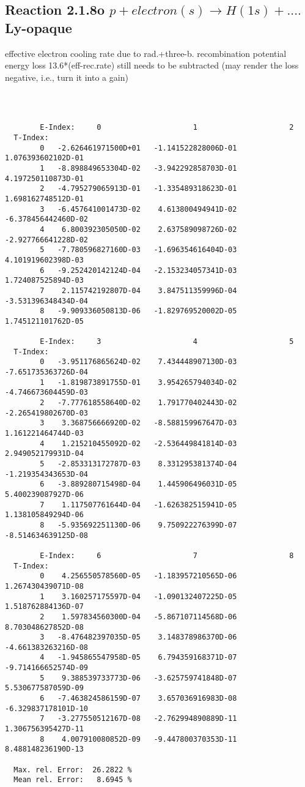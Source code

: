 \subsection{
  Reaction 2.1.8o $p + electron(s) \rightarrow H(1s) + ....$ Ly-opaque
}

   effective electron cooling rate due to rad.+three-b. recombination
   potential energy loss 13.6*(eff-rec.rate) still needs to be
   subtracted (may render the loss negative, i.e., turn it into a gain)

\begin{verbatim}



        E-Index:     0                     1                     2
  T-Index:
        0   -2.626461971500D+01   -1.141522828006D-01    1.076393602102D-01
        1   -8.898849653304D-02   -3.942292858703D-01    4.197250110873D-01
        2   -4.795279065913D-01   -1.335489318623D-01    1.698162748512D-01
        3   -6.457641001473D-02    4.613800494941D-02   -6.378456442460D-02
        4    6.800392305050D-02    2.637589098726D-02   -2.927766641228D-02
        5   -7.780596827160D-03   -1.696354616404D-03    4.101919602398D-03
        6   -9.252420142124D-04   -2.153234057341D-03    1.724087525894D-03
        7    2.115742192807D-04    3.847511359996D-04   -3.531396348434D-04
        8   -9.909336050813D-06   -1.829769520002D-05    1.745121101762D-05

        E-Index:     3                     4                     5
  T-Index:
        0   -3.951176865624D-02    7.434448907130D-03   -7.651735363726D-04
        1   -1.819873891755D-01    3.954265794034D-02   -4.746673604459D-03
        2   -7.777618558640D-02    1.791770402443D-02   -2.265419802670D-03
        3    3.368756666920D-02   -8.588159967647D-03    1.161221464744D-03
        4    1.215210455092D-02   -2.536449841814D-03    2.949052179931D-04
        5   -2.853313172787D-03    8.331295381374D-04   -1.219354343653D-04
        6   -3.889280715498D-04    1.445906496031D-05    5.400239087927D-06
        7    1.117507761644D-04   -1.626382515941D-05    1.138105849294D-06
        8   -5.935692251130D-06    9.750922276399D-07   -8.514634639125D-08

        E-Index:     6                     7                     8
  T-Index:
        0    4.256550578560D-05   -1.183957210565D-06    1.267430439071D-08
        1    3.160257175597D-04   -1.090132407225D-05    1.518762884136D-07
        2    1.597834560300D-04   -5.867107114568D-06    8.703048627852D-08
        3   -8.476482397035D-05    3.148378986370D-06   -4.661383263216D-08
        4   -1.945865547958D-05    6.794359168371D-07   -9.714166652574D-09
        5    9.388539733773D-06   -3.625759741848D-07    5.530677587059D-09
        6   -7.463824586159D-07    3.657036916983D-08   -6.329837178101D-10
        7   -3.277550512167D-08   -2.762994890889D-11    1.306756395427D-11
        8    4.007910080852D-09   -9.447800370353D-11    8.488148236190D-13

  Max. rel. Error:  26.2822 %
  Mean rel. Error:   8.6945 %

\end{verbatim}
